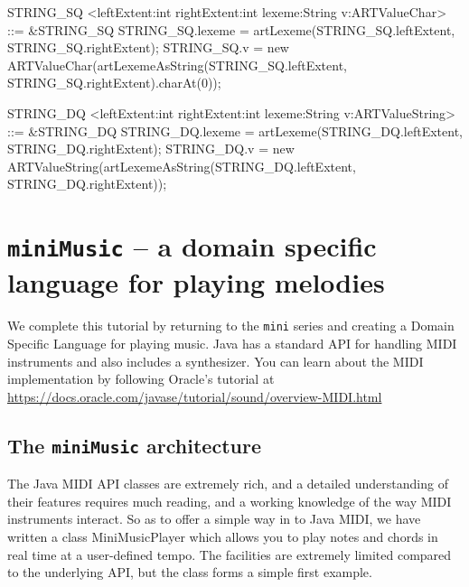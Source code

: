 \begin{codeblock}
STRING_SQ <leftExtent:int rightExtent:int lexeme:String v:ARTValueChar> ::= 
  &STRING_SQ 
 { STRING_SQ.lexeme = artLexeme(STRING_SQ.leftExtent, STRING_SQ.rightExtent); 
  STRING_SQ.v = 
  new ARTValueChar(artLexemeAsString(STRING_SQ.leftExtent, STRING_SQ.rightExtent).charAt(0)); }  

STRING_DQ <leftExtent:int rightExtent:int lexeme:String v:ARTValueString> ::= 
  &STRING_DQ 
  { STRING_DQ.lexeme = artLexeme(STRING_DQ.leftExtent, STRING_DQ.rightExtent); 
  STRING_DQ.v = 
  new ARTValueString(artLexemeAsString(STRING_DQ.leftExtent, STRING_DQ.rightExtent)); }  
\end{codeblock}


\chapter{{\tt miniMusic} -- a domain specific language for playing melodies}
We complete this tutorial by returning to the {\tt mini} series and creating a Domain Specific Language for playing music. Java has a standard API for handling MIDI instruments and also includes a synthesizer. You can learn about the MIDI implementation by following Oracle's tutorial at \url{https://docs.oracle.com/javase/tutorial/sound/overview-MIDI.html}
\section{The {\tt miniMusic} architecture}
The Java MIDI API classes are extremely rich, and a detailed understanding of their features requires much reading, and a working knowledge of the way MIDI instruments interact. So as to offer a simple way in to Java MIDI, we have written a class {\sf MiniMusicPlayer} which allows you to play notes and chords in real time at a user-defined tempo. The facilities are extremely limited compared to the underlying API, but the class forms a simple first example. 

